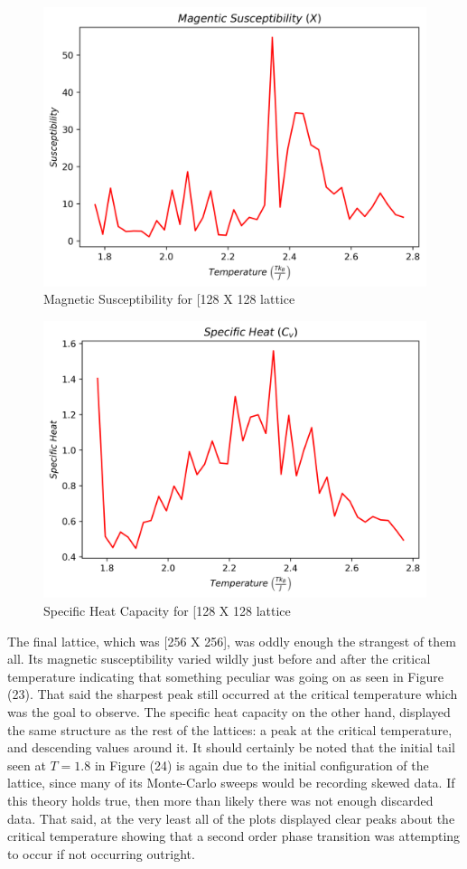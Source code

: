 \documentclass[twocolumn]{article}
\begin{document}
\begin{figure}[H]
\caption{Magnetic Susceptibility for [128 X 128 lattice}
\centering
\includegraphics[scale=.45]{MagSuscept128}
\end{figure}
\begin{figure}[h]
\caption{Specific Heat Capacity for [128 X 128 lattice}
\centering
\includegraphics[scale=.45]{SpecificHeat128}
\end{figure}
The final lattice, which was [256 X 256], was oddly enough the strangest of them all. Its magnetic susceptibility varied wildly just before and after the critical temperature indicating that something peculiar was going on as seen in Figure (23). That said the sharpest peak still occurred at the critical temperature which was the goal to observe. The specific heat capacity on the other hand, displayed the same structure as the rest of the lattices: a peak at the critical temperature, and descending values around it. It should certainly be noted that the initial tail seen at $T=1.8$ in Figure (24) is again due to the initial configuration of the lattice, since many of its Monte-Carlo sweeps would be recording skewed data. If this theory holds true, then more than likely there was not enough discarded data. That said, at the very least all of the plots displayed clear peaks about the critical temperature showing that a second order phase transition was attempting to occur if not occurring outright.
\end{document}
